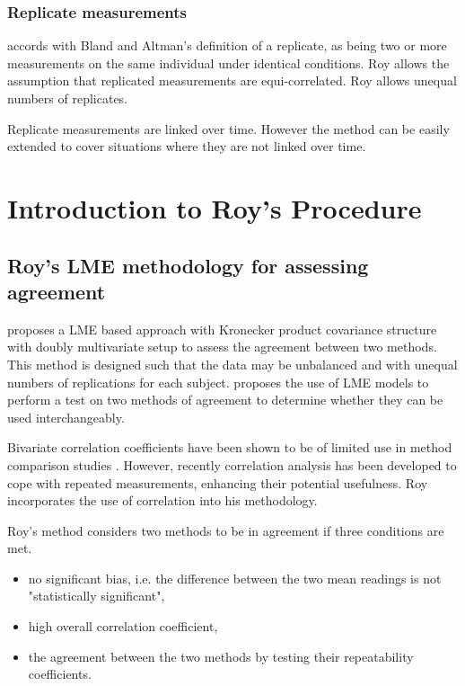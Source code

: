 \documentclass[12pt, a4paper]{report}
\theoremstyle{plain}
\theoremstyle{definition}
\theoremstyle{remark}
\begin{document}
\subsection{Replicate measurements}
\citet{ARoy2009} accords with Bland and Altman’s definition of a replicate, as being two or more measurements on the same individual under identical conditions.
Roy allows the assumption that replicated measurements are equi-correlated.
Roy allows unequal numbers of replicates.

Replicate measurements are linked over time. However the method can be easily extended to cover situations where they are not linked over time.


\chapter{Introduction to Roy's Procedure}
		\section{Roy's LME methodology for assessing agreement}
		
		\citet{ARoy2009} proposes a LME based approach with Kronecker
		product covariance structure with doubly multivariate setup to
		assess the agreement between two methods. This method is designed
		such that the data may be unbalanced and with unequal numbers of
		replications for each subject.	\citet{ARoy2009} proposes the use of LME models to perform a test on two methods of agreement to determine whether they can be used 	interchangeably.
		
		Bivariate correlation coefficients have been shown to be of limited use in method comparison studies \citep{BA86}. However,	recently correlation analysis has been developed to cope with
		repeated measurements, enhancing their potential usefulness. Roy
		incorporates the use of correlation into his methodology.
		
		Roy's method considers two methods to be in agreement if three
		conditions are met.
		
		\begin{itemize}
			\item no significant bias, i.e. the difference between the two
			mean readings is not "statistically significant",
			
			\item high overall correlation coefficient,
			
			\item the agreement between the two methods by testing their
			repeatability coefficients.
			
		\end{itemize}
		
\end{document}
